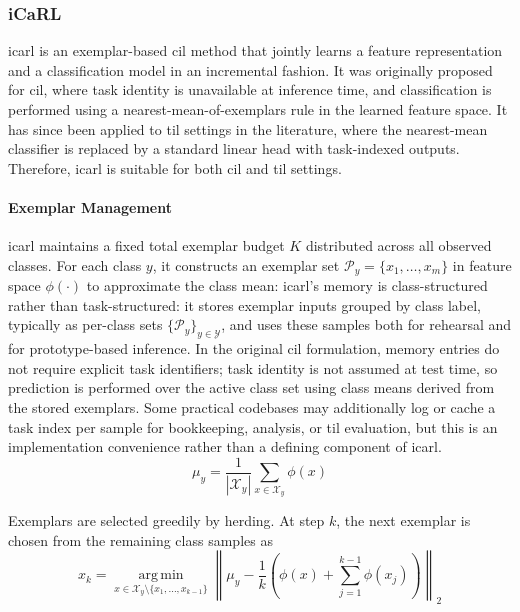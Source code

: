 \subsubsection{iCaRL}
\gls{icarl} \cite{ll_mof_2017} is an exemplar-based \gls{cil} method that jointly learns a feature representation and a classification model in an incremental fashion. It was originally proposed for \gls{cil}, where task identity is unavailable at inference time, and classification is performed using a nearest-mean-of-exemplars rule in the learned feature space. It has since been applied to \gls{til} settings in the literature, where the nearest-mean classifier is replaced by a standard linear head with task-indexed outputs. Therefore, \gls{icarl} is suitable for both \gls{cil} and \gls{til} settings.

\paragraph{Exemplar Management}
\gls{icarl} maintains a fixed total exemplar budget $K$ distributed across all observed classes.
For each class \(y\), it constructs an exemplar set \(\mathcal{P}_y=\{x_1,\ldots,x_m\}\) in feature space \(\phi(\cdot)\) to approximate the class mean:
\gls{icarl}'s memory is class-structured rather than task-structured: it stores exemplar inputs grouped by class label, typically as per-class sets \(\{\mathcal{P}_y\}_{y \in \mathcal{Y}}\), and uses these samples both for rehearsal and for prototype-based inference.
In the original \gls{cil} formulation, memory entries do not require explicit task identifiers; task identity is not assumed at test time, so prediction is performed over the active class set using class means derived from the stored exemplars.
Some practical codebases may additionally log or cache a task index per sample for bookkeeping, analysis, or \gls{til} evaluation, but this is an implementation convenience rather than a defining component of \gls{icarl}.
\begin{equation}
\mu_y=\frac{1}{|\mathcal{X}_y|}\sum_{x\in\mathcal{X}_y}\phi(x)
\end{equation}

Exemplars are selected greedily by herding. At step \(k\), the next exemplar is chosen from the remaining class samples as
\begin{equation}
x_k=\operatorname*{arg\,min}_{x\in \mathcal{X}_y\setminus\{x_1,\ldots,x_{k-1}\}}
\left\|
\mu_y-\frac{1}{k}\left(\phi(x)+\sum_{j=1}^{k-1}\phi(x_j)\right)
\right\|_2
\label{eqn:icarl_exemplar}
\end{equation}

